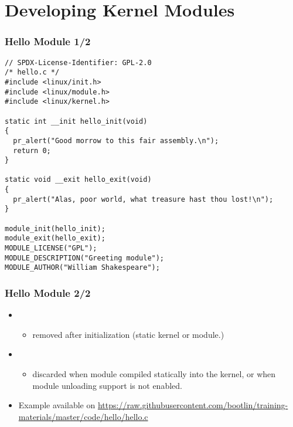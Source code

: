 \section{Developing Kernel Modules}

\begin{frame}[fragile]
  \frametitle{Hello Module 1/2}
\begin{verbatim}
// SPDX-License-Identifier: GPL-2.0
/* hello.c */
#include <linux/init.h>
#include <linux/module.h>
#include <linux/kernel.h>

static int __init hello_init(void)
{
  pr_alert("Good morrow to this fair assembly.\n");
  return 0;
}

static void __exit hello_exit(void)
{
  pr_alert("Alas, poor world, what treasure hast thou lost!\n");
}

module_init(hello_init);
module_exit(hello_exit);
MODULE_LICENSE("GPL");
MODULE_DESCRIPTION("Greeting module");
MODULE_AUTHOR("William Shakespeare");
\end{verbatim}
\end{frame}

\begin{frame}[fragile]
  \frametitle{Hello Module 2/2}
\begin{itemize}
\item {}
  \begin{itemize}
  \item removed after initialization (static kernel or module.)
  \end{itemize}
\item {}
  \begin{itemize}
  \item discarded when module compiled statically into the kernel,
        or when module unloading support is not enabled.
  \end{itemize}
\item Example available on
  \url{https://raw.githubusercontent.com/bootlin/training-materials/master/code/hello/hello.c}
\end{itemize}
\end{frame}

